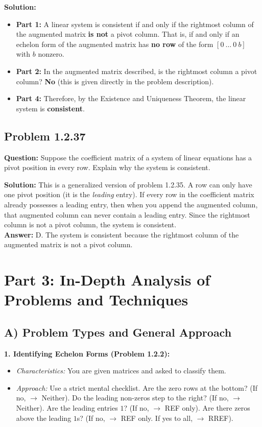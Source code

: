 \documentclass[11pt]{article}
\begin{document}
\textbf{Solution:}
\begin{itemize}
    \item \textbf{Part 1:} A linear system is consistent if and only if the rightmost column of the augmented matrix \textbf{is not} a pivot column. That is, if and only if an echelon form of the augmented matrix has \textbf{no row} of the form $[0 \ \dots \ 0 \ b]$ with $b$ nonzero.
    \item \textbf{Part 2:} In the augmented matrix described, is the rightmost column a pivot column? \textbf{No} (this is given directly in the problem description).
    \item \textbf{Part 4:} Therefore, by the Existence and Uniqueness Theorem, the linear system is \textbf{consistent}.
\end{itemize}


\subsection*{Problem 1.2.37}
\textbf{Question:} Suppose the coefficient matrix of a system of linear equations has a pivot position in every row. Explain why the system is consistent.

\textbf{Solution:}
This is a generalized version of problem 1.2.35. A row can only have one pivot position (it is the \textit{leading} entry). If every row in the coefficient matrix already possesses a leading entry, then when you append the augmented column, that augmented column can never contain a leading entry. Since the rightmost column is not a pivot column, the system is consistent.
\\
\textbf{Answer:} D. The system is consistent because the rightmost column of the augmented matrix is not a pivot column.

\newpage
\section{Part 3: In-Depth Analysis of Problems and Techniques}

\subsection{A) Problem Types and General Approach}

\textbf{1. Identifying Echelon Forms (Problem 1.2.2):}
\begin{itemize}
    \item \textit{Characteristics:} You are given matrices and asked to classify them.
    \item \textit{Approach:} Use a strict mental checklist. Are the zero rows at the bottom? (If no, $\to$ Neither). Do the leading non-zeros step to the right? (If no, $\to$ Neither). Are the leading entries $1$? (If no, $\to$ REF only). Are there zeros above the leading $1$s? (If no, $\to$ REF only. If yes to all, $\to$ RREF).
\end{itemize}
\end{document}
